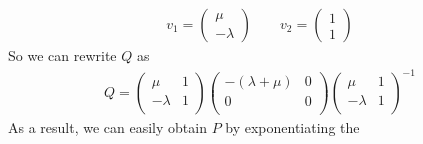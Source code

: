 \documentclass[12pt]{article}
\theoremstyle{plain}
\theoremstyle{definition}
\theoremstyle{remark}
\begin{document}
\begin{enumerate}
\begin{enumerate}
      \begin{align*}
        v_1 = \begin{pmatrix} \mu \\ -\lambda \end{pmatrix}  \qquad
        v_2 = \begin{pmatrix} 1 \\ 1 \end{pmatrix}
      \end{align*}
      So we can rewrite $Q$ as
      \begin{align*}
        Q =
          \begin{pmatrix}
            \mu & 1 \\
            -\lambda & 1 \\
          \end{pmatrix}
          \begin{pmatrix}
            -(\lambda+\mu) & 0 \\
            0 & 0 \\
          \end{pmatrix}
          \begin{pmatrix}
            \mu & 1 \\
            -\lambda & 1 \\
          \end{pmatrix}^{-1}
      \end{align*}
      As a result, we can easily obtain $P$ by exponentiating the

\end{enumerate}
\end{enumerate}
\end{document}
